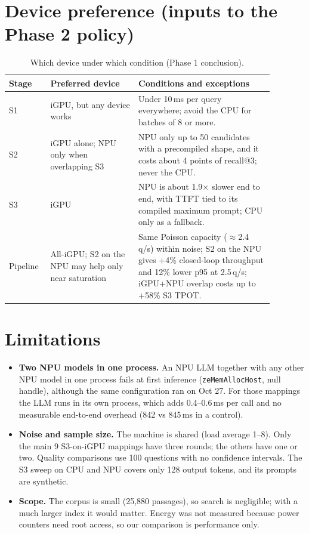 \documentclass[10pt]{article}
\begin{document}
\section{Device preference (inputs to the Phase 2 policy)}
\begin{table}[H]\centering\small
\caption{Which device under which condition (Phase 1 conclusion).}\label{tab:prefer}
\begin{tabular}{p{0.12\linewidth}p{0.3\linewidth}p{0.46\linewidth}}\toprule
Stage & Preferred device & Conditions and exceptions\\\midrule
S1 & iGPU, but any device works & Under 10\,ms per query everywhere; avoid the CPU for batches of 8 or more.\\
S2 & iGPU alone; NPU only when overlapping S3 & NPU only up to 50 candidates with a precompiled shape, and it costs about 4 points of recall@3; never the CPU.\\
S3 & iGPU & NPU is about 1.9$\times$ slower end to end, with TTFT tied to its compiled maximum prompt; CPU only as a fallback.\\
Pipeline & All-iGPU; S2 on the NPU may help only near saturation & Same Poisson capacity ($\approx$2.4\,q/s) within noise; S2 on the NPU gives +4\% closed-loop throughput and 12\% lower p95 at 2.5\,q/s; iGPU+NPU overlap costs up to +58\% S3 TPOT.\\\bottomrule
\end{tabular}
\end{table}



\section{Limitations}
\begin{itemize}\setlength\itemsep{0pt}
\item \textbf{Two NPU models in one process.} An NPU LLM together with any other NPU model in one process fails at first inference (\texttt{zeMemAllocHost}, null handle), although the same configuration ran on Oct 27. For those mappings the LLM runs in its own process, which adds 0.4--0.6\,ms per call and no measurable end-to-end overhead (842 vs 845\,ms in a control).
\item \textbf{Noise and sample size.} The machine is shared (load average 1--8). Only the main 9 S3-on-iGPU mappings have three rounds; the others have one or two. Quality comparisons use 100 questions with no confidence intervals. The S3 sweep on CPU and NPU covers only 128 output tokens, and its prompts are synthetic.
\item \textbf{Scope.} The corpus is small (25,880 passages), so search is negligible; with a much larger index it would matter. Energy was not measured because power counters need root access, so our comparison is performance only.
\end{itemize}
\end{document}
